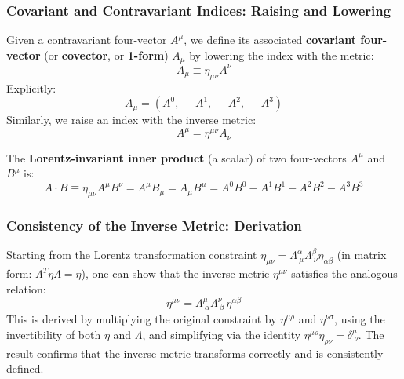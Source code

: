 \subsubsection*{Covariant and Contravariant Indices: Raising and Lowering}

Given a contravariant four-vector $A^\mu$, we define its associated \textbf{covariant four-vector} (or \textbf{covector}, or \textbf{1-form}) $A_\mu$ by lowering the index with the metric:
\begin{equation}\label{eq:lec05:lower-index}
    A_\mu \equiv \eta_{\mu\nu} A^\nu
\end{equation}
Explicitly:
\begin{equation}\label{eq:lec05:lowered-components}
    A_\mu = (A^0,\, -A^1,\, -A^2,\, -A^3)
\end{equation}
Similarly, we raise an index with the inverse metric:
\begin{equation}\label{eq:lec05:raise-index}
    A^\mu = \eta^{\mu\nu} A_\nu
\end{equation}

The \textbf{Lorentz-invariant inner product} (a scalar) of two four-vectors $A^\mu$ and $B^\mu$ is:
\begin{equation}\label{eq:lec05:inner-product}
    A \cdot B \equiv \eta_{\mu\nu} A^\mu B^\nu = A^\mu B_\mu = A_\mu B^\mu = A^0 B^0 - A^1 B^1 - A^2 B^2 - A^3 B^3
\end{equation}

\subsubsection*{Consistency of the Inverse Metric: Derivation}

Starting from the Lorentz transformation constraint $\eta_{\mu\nu} = \Lambda^\alpha_{\ \mu} \Lambda^\beta_{\ \nu} \eta_{\alpha\beta}$ (in matrix form: $\Lambda^T \eta \Lambda = \eta$), one can show that the inverse metric $\eta^{\mu\nu}$ satisfies the analogous relation:
\begin{equation}\label{eq:lec05:inverse-metric-transform}
    \eta^{\mu\nu} = \Lambda^\mu_{\ \alpha} \Lambda^\nu_{\ \beta}\, \eta^{\alpha\beta}
\end{equation}
This is derived by multiplying the original constraint by $\eta^{\mu\rho}$ and $\eta^{\nu\sigma}$, using the invertibility of both $\eta$ and $\Lambda$, and simplifying via the identity $\eta^{\mu\rho}\eta_{\rho\nu} = \delta^\mu_{\ \nu}$. The result confirms that the inverse metric transforms correctly and is consistently defined.

